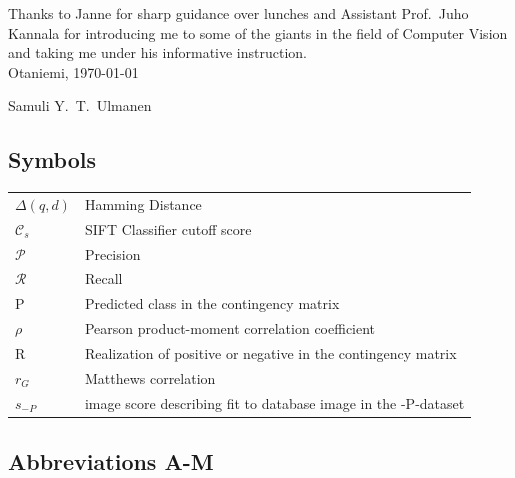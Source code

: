 \documentclass[english,12pt,a4paper,pdftex,elec,utf8, table]{aaltothesis}
\begin{document}
Thanks to Janne for sharp guidance over lunches and Assistant Prof.\ Juho Kannala for introducing me to some of the giants in the field of Computer Vision and taking me under his informative instruction.\\

\vspace{5cm}
Otaniemi, \today

\vspace{5mm}
{\hfill Samuli Y.\ T.\ Ulmanen \hspace{1cm}}

\newpage


\thesistableofcontents


\subsection*{Symbols}

\begin{tabular}{ll}
$\Delta(q,d)$ & Hamming Distance\\
$\mathcal{C}_s$ & SIFT Classifier cutoff score\\
  $\mathcal{P}$ & Precision\\
  $\mathcal{R}$ & Recall\\
  P & Predicted class in the contingency matrix\\
  $\rho$ & Pearson product-moment correlation coefficient\\
  R & Realization of positive or negative in the contingency matrix\\
  $r_G$ & Matthews correlation\\
  $s_{-P}$ & image score describing fit to database image in the -P-dataset\\
\end{tabular}

\subsection*{Abbreviations A-M}
\end{document}
